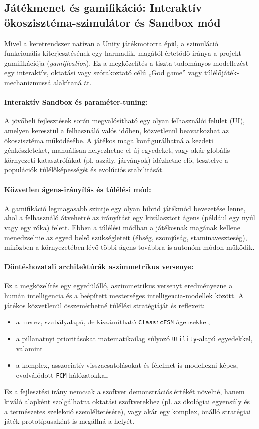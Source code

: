 \subsection{Játékmenet és gamifikáció: Interaktív ökoszisztéma-szimulátor és Sandbox mód}

Mivel a keretrendszer natívan a Unity játékmotorra épül, a szimuláció funkcionális kiterjesztésének egy harmadik, magától értetődő iránya a projekt gamifikációja (\textit{gamification}). Ez a megközelítés a tiszta tudományos modellezést egy interaktív, oktatási vagy szórakoztató célú „God game” vagy túlélőjáték-mechanizmussá alakítaná át.

\paragraph{Interaktív Sandbox és paraméter-tuning:}
A jövőbeli fejlesztések során megvalósítható egy olyan felhasználói felület (UI), amelyen keresztül a felhasználó valós időben, közvetlenül beavatkozhat az ökoszisztéma működésébe. A játékos maga konfigurálhatná a kezdeti génkészleteket, manuálisan helyezhetne el új egyedeket, vagy akár globális környezeti katasztrófákat (pl. aszály, járványok) idézhetne elő, tesztelve a populációk túlélőképességét és evolúciós stabilitását.

\paragraph{Közvetlen ágens-irányítás és túlélési mód:}
A gamifikáció legmagasabb szintje egy olyan hibrid játékmód bevezetése lenne, ahol a felhasználó átvehetné az irányítást egy kiválasztott ágens (például egy nyúl vagy egy róka) felett. Ebben a túlélési módban a játékosnak magának kellene menedzselnie az egyed belső szükségleteit (éhség, szomjúság, staminaveszteség), miközben a környezetében lévő többi ágens továbbra is autonóm módon működik.

\paragraph{Döntéshozatali architektúrák aszimmetrikus versenye:}
Ez a megközelítés egy egyedülálló, aszimmetrikus versenyt eredményezne a humán intelligencia és a beépített mesterséges intelligencia-modellek között. A játékos közvetlenül összemérhetné túlélési stratégiáját és reflexeit:
\begin{itemize}
    \item a merev, szabályalapú, de kiszámítható \texttt{ClassicFSM} ágensekkel,
    \item a pillanatnyi prioritásokat matematikailag súlyozó \texttt{Utility}-alapú egyedekkel, valamint
    \item a komplex, asszociatív visszacsatolásokat és félelmet is modellezni képes, evolválódott \texttt{FCM} hálózatokkal.
\end{itemize}

Ez a fejlesztési irány nemcsak a szoftver demonstrációs értékét növelné, hanem kiváló alapként szolgálhatna oktatási szoftverekhez (pl. az ökológiai egyensúly és a természetes szelekció szemléltetésére), vagy akár egy komplex, önálló stratégiai játék prototípusaként is megállná a helyét.
